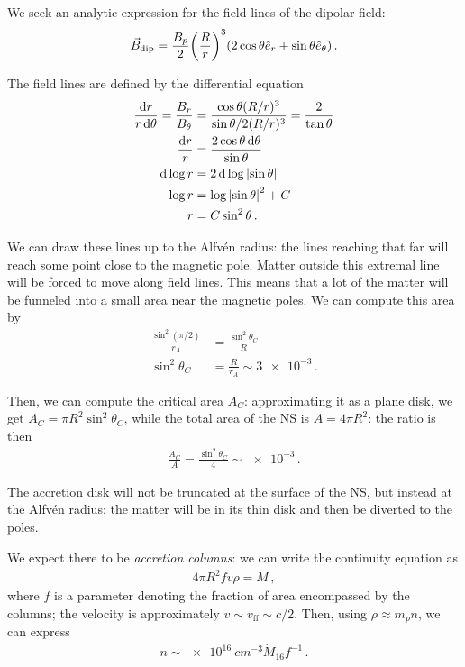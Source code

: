 \documentclass[main.tex]{subfiles}
\begin{document}

We seek an analytic expression for the field lines of the dipolar field: 
%
\begin{align}
\vec{B} _{\text{dip}} = \frac{B_p}{2} \qty( \frac{R}{r})^3 \qty(2 \cos \theta \hat{e}_r + \sin \theta \hat{e}_\theta )
\,.
\end{align}

The field lines are defined by the differential equation 
%
\begin{align}
\frac{ \dd{r}}{ r \dd{\theta }} = \frac{B_r}{B_\theta } &= \frac{ \cos \theta ( R / r )^3}{\sin \theta /2 (R / r)^3} = \frac{2}{\tan \theta }  \\
\frac{\dd{r}}{r} &= \frac{2 \cos \theta \dd{\theta }}{\sin \theta }  \\
\dd{\log r} &= 2 \dd{\log \abs{\sin \theta }}  \\
\log r &= \log \abs{\sin \theta }^2 + C  \\
r &= C \sin^2 \theta
\,.
\end{align}

We can draw these lines up to the Alfvén radius: the lines reaching that far will reach some point close to the magnetic pole. 
Matter outside this extremal line will be forced to move along field lines.
This means that a lot of the matter will be funneled into a small area near the magnetic poles. We can compute this area by 
%
\begin{align}
\frac{\sin^2  (\pi / 2)}{r_A} &= \frac{\sin^2\theta_C}{R}  \\
\sin^2 \theta _C & = \frac{R}{r_A} \sim \num{3e-3}
\,.
\end{align}

Then, we can compute the critical area \(A_C\): approximating it as a plane disk, we get \(A_C = \pi R^2 \sin^2 \theta _C\), while the total area of the NS is \(A = 4 \pi R^2\): the ratio is then 
%
\begin{align}
\frac{A_C}{A} = \frac{\sin^2 \theta _C}{4} \sim \num{e-3}
\,.
\end{align}

The accretion disk will not be truncated at the surface of the NS, but instead at the Alfvén radius: the matter will be in its thin disk and then be diverted to the poles. 

We expect there to be \emph{accretion columns}: we can write the continuity equation as 
%
\begin{align}
4 \pi R^2 f v \rho = \dot{M}
\,,
\end{align}
%
where \(f\) is a parameter denoting the fraction of area encompassed by the columns; the velocity is approximately \(v \sim v _{\text{ff}} \sim c/2\). 
Then, using \(\rho \approx m_p n\), we can express 
%
\begin{align}
n \sim \SI{e16}{cm^{-3}} \dot{M}_{16} f^{-1}
\,.
\end{align}
\end{document}
